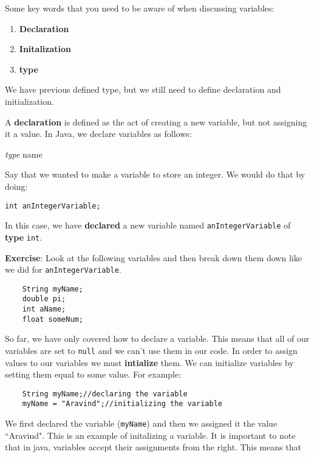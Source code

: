 \documentclass[11pt,fleqn]{article}
\begin{document}
Some key words that you need to be aware of when discussing variables:
\begin{enumerate}
\item
\textbf{Declaration}

\item
\textbf{Initalization}

\item
\textbf{type}
\end{enumerate}

We have previous defined type, but we still need to define declaration and
initialization. 

A \textbf{declaration} is defined as the act of creating a new variable, but not
assigning it a value. In Java, we declare variables as follows:

\textit{type} name

Say that we wanted to make a variable to store an integer. We would do that by
doing:

\begin{verbatim}
int anIntegerVariable;
\end{verbatim}

In this case, we have \textbf{declared} a new variable named
\texttt{anIntegerVariable} of \textbf{type} \texttt{int}. 

\textbf{Exercise}: Look at the following variables and then break down them down
like we did for \texttt{anIntegerVariable}. 

\begin{verbatim}
    String myName;
    double pi;
    int aName;
    float someNum;
\end{verbatim}

So far, we have only covered how to declare a variable. This means that all of
our variables are set to \texttt{null} and we can't use them in our code. In
order to assign values to our variables we must \textbf{intialize} them. We can
initialize variables by setting them equal to some value. For example:

\begin{verbatim}
    String myName;//declaring the variable
    myName = "Aravind";//initializing the variable
\end{verbatim}

We first declared the variable (\texttt{myName}) and then we assigned it the
value ``Aravind". This is an example of initalizing a variable. It is important
to note that in java, variables accept their assignments from the right. This
means that 
\end{document}
